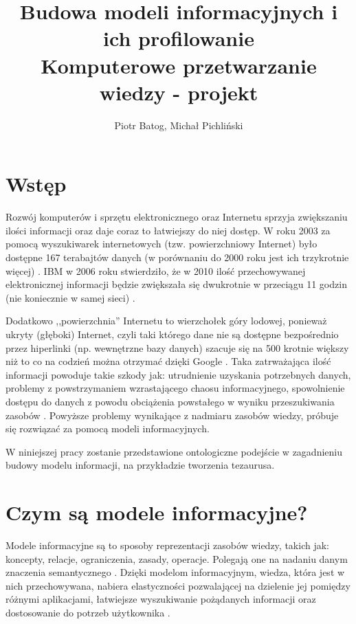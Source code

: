 \documentclass[12pt,a4paper,notitlepage]{article}
\title{Budowa modeli informacyjnych i ich profilowanie \\
  Komputerowe przetwarzanie wiedzy - projekt}
\author{Piotr Batog, Michał Pichliński}
\begin{document}

\maketitle

\section{Wstęp}
Rozwój komputerów i sprzętu elektronicznego oraz Internetu sprzyja zwiększaniu
ilości informacji oraz daje coraz to łatwiejszy do niej dostęp. W roku 2003
za pomocą wyszukiwarek internetowych (tzw. powierzchniowy Internet)
było dostępne 167 terabajtów danych (w porównaniu do 2000 roku jest ich
trzykrotnie więcej) \cite{HowMuchInformation}.
IBM w 2006 roku stwierdziło, że w 2010 ilość przechowywanej elektronicznej
informacji będzie zwiększała się dwukrotnie w przeciągu 11 godzin 
(nie koniecznie w samej sieci) \cite{ToxicTerabyte}.

Dodatkowo ,,powierzchnia'' Internetu to wierzchołek góry lodowej, ponieważ
ukryty (głęboki) Internet, czyli taki którego dane nie są dostępne 
bezpośrednio przez hiperlinki (np. wewnętrzne bazy danych) szacuje się na 500
krotnie większy niż to co na codzień można otrzymać dzięki Google 
\cite{DeepWeb}. Taka zatrważająca ilość informacji powoduje takie szkody jak: 
utrudnienie uzyskania potrzebnych danych, problemy z powstrzymaniem
wzrastającego chaosu informacyjnego, spowolnienie dostępu do danych z powodu
obciążenia powstałego w wyniku przeszukiwania zasobów \cite{ToxicTerabyte}.
Powyższe problemy wynikające z nadmiaru zasobów wiedzy, próbuje się rozwiązać 
za pomocą modeli informacyjnych. 

W niniejszej pracy zostanie przedstawione ontologiczne podejście w zagadnieniu budowy modelu informacji, na przykładzie tworzenia tezaurusa. 

\section{Czym są modele informacyjne?}
Modele informacyjne są to sposoby reprezentacji zasobów wiedzy, takich jak:
koncepty, relacje, ograniczenia, zasady, operacje. Polegają one na nadaniu
danym znaczenia semantycznego \cite{Tina}. Dzięki modelom informacyjnym,
wiedza, która jest w nich przechowywana, nabiera elastyczności pozwalającej 
na dzielenie jej pomiędzy różnymi aplikacjami, łatwiejsze wyszukiwanie
pożądanych informacji oraz dostosowanie do potrzeb użytkownika 
\cite{GilbaneReport}.
\end{document}
